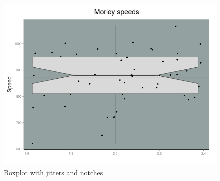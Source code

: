 \begin{figure}[htbp]
 \centering
 \includegraphics[scale = .50]{images/jitter}
 \caption*{Boxplot with jitters and notches}
\end{figure}


